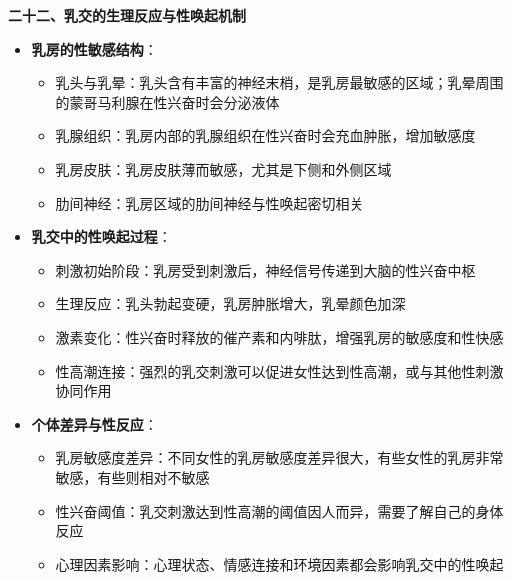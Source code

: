 \documentclass[12pt,UTF8]{ctexbook}
\begin{document}
  \textbf{二十二、乳交的生理反应与性唤起机制}
  \begin{itemize}
  \item \textbf{乳房的性敏感结构}：
    \begin{itemize}
    \item 乳头与乳晕：乳头含有丰富的神经末梢，是乳房最敏感的区域；乳晕周围的蒙哥马利腺在性兴奋时会分泌液体
    \item 乳腺组织：乳房内部的乳腺组织在性兴奋时会充血肿胀，增加敏感度
    \item 乳房皮肤：乳房皮肤薄而敏感，尤其是下侧和外侧区域
    \item 肋间神经：乳房区域的肋间神经与性唤起密切相关
    \end{itemize}
  \item \textbf{乳交中的性唤起过程}：
    \begin{itemize}
    \item 刺激初始阶段：乳房受到刺激后，神经信号传递到大脑的性兴奋中枢
    \item 生理反应：乳头勃起变硬，乳房肿胀增大，乳晕颜色加深
    \item 激素变化：性兴奋时释放的催产素和内啡肽，增强乳房的敏感度和性快感
    \item 性高潮连接：强烈的乳交刺激可以促进女性达到性高潮，或与其他性刺激协同作用
    \end{itemize}
  \item \textbf{个体差异与性反应}：
    \begin{itemize}
    \item 乳房敏感度差异：不同女性的乳房敏感度差异很大，有些女性的乳房非常敏感，有些则相对不敏感
    \item 性兴奋阈值：乳交刺激达到性高潮的阈值因人而异，需要了解自己的身体反应
    \item 心理因素影响：心理状态、情感连接和环境因素都会影响乳交中的性唤起
    \end{itemize}
  \end{itemize}
\end{document}
